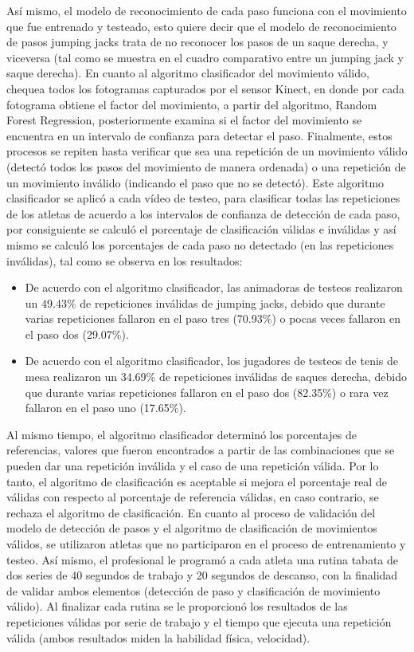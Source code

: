 \medbreak
As\'i mismo, el modelo de reconocimiento de cada paso funciona con el movimiento que fue entrenado y testeado, esto quiere decir que el modelo de reconocimiento de pasos jumping jacks trata de no reconocer los pasos de un saque derecha, y viceversa (tal como se muestra en el cuadro comparativo entre un jumping jack  y saque derecha).
\medbreak
En cuanto al algoritmo clasificador del movimiento v\'alido, chequea todos los fotogramas capturados por el sensor Kinect, en donde por cada fotograma obtiene el factor del movimiento, a partir del algoritmo, Random Forest Regression, posteriormente examina si el factor del movimiento se encuentra en un intervalo de confianza para detectar el paso. Finalmente, estos procesos se repiten hasta verificar que sea una repetici\'on de un movimiento v\'alido (detect\'o todos los pasos del movimiento de manera ordenada) o una repetici\'on de un movimiento inv\'alido (indicando el paso que no se detect\'o).
\medbreak
Este algoritmo clasificador se aplic\'o a cada v\'ideo de testeo, para clasificar todas las repeticiones de los atletas de acuerdo a los intervalos de confianza de detecci\'on de cada paso, por consiguiente se calcul\'o el porcentaje de clasificaci\'on v\'alidas e inv\'alidas y as\'i mismo se calcul\'o los porcentajes de cada paso no detectado (en las repeticiones inv\'alidas), tal como se observa en los resultados:
\begin{itemize}
\item	De acuerdo con el algoritmo clasificador, las animadoras de testeos realizaron un 49.43\% de repeticiones inv\'alidas de jumping jacks, debido que durante varias repeticiones fallaron en el paso tres (70.93\%) o pocas veces fallaron en el paso dos (29.07\%).
\item De acuerdo con el algoritmo clasificador, los jugadores de testeos de tenis de mesa realizaron un 34.69\% de repeticiones inv\'alidas de saques derecha, debido que durante varias repeticiones fallaron en el paso dos (82.35\%) o rara vez fallaron en el paso uno (17.65\%).
\end{itemize}
Al mismo tiempo, el algoritmo clasificador determin\'o los porcentajes de referencias, valores que fueron encontrados a partir de las combinaciones que se pueden dar una repetici\'on inv\'alida y el caso de una repetici\'on v\'alida. 
\medbreak
Por lo tanto, el algoritmo de clasificaci\'on es aceptable si mejora el porcentaje real de v\'alidas con respecto al porcentaje de referencia v\'alidas, en caso contrario, se rechaza el algoritmo de clasificaci\'on.
\medbreak
En cuanto al proceso de validaci\'on del modelo de detecci\'on de pasos y el algoritmo de clasificaci\'on de movimientos v\'alidos, se utilizaron atletas que no participaron en el proceso de entrenamiento y testeo. As\'i mismo, el profesional le program\'o a cada atleta una rutina tabata de dos series de 40 segundos de trabajo y 20 segundos de descanso, con la finalidad de validar ambos elementos (detecci\'on de paso y clasificaci\'on de movimiento v\'alido). Al finalizar cada rutina se le proporcion\'o los resultados de las repeticiones v\'alidas por serie de trabajo y el tiempo que ejecuta una repetici\'on v\'alida (ambos resultados miden la habilidad f\'isica, velocidad). 
